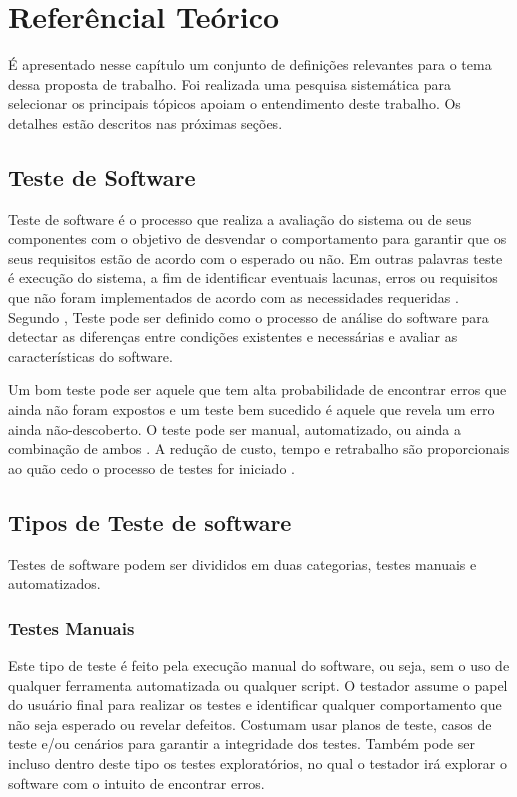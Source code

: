\chapter{Referêncial Teórico}

É apresentado nesse capítulo um conjunto de definições relevantes para o tema dessa proposta de trabalho. Foi realizada uma pesquisa sistemática para selecionar os principais tópicos apoiam o entendimento deste trabalho. Os detalhes estão descritos nas próximas seções.

\section{Teste de Software}

Teste de software é o processo que realiza a avaliação do sistema ou de seus componentes com o objetivo de desvendar o comportamento para garantir que os seus requisitos estão de acordo com o esperado ou não. Em outras palavras teste é execução do sistema, a fim de identificar eventuais lacunas, erros ou requisitos que não foram implementados de acordo com as necessidades requeridas \cite{tutorialsPoint}. Segundo \cite{ansiieee1059}, Teste pode ser definido como o processo de análise do software para detectar as diferenças entre condições existentes e necessárias e avaliar as características do software.

Um bom teste pode ser aquele que tem alta probabilidade de encontrar erros que ainda não foram expostos e um teste bem sucedido é aquele que revela um erro ainda não-descoberto. O teste pode ser manual, automatizado, ou ainda a combinação de ambos \cite{Pressman2002}. A redução de custo, tempo e retrabalho são proporcionais ao quão cedo o processo de testes for iniciado \cite{tutorialsPoint}.

\section{Tipos de Teste de software}

Testes de software podem ser divididos em duas categorias, testes manuais e automatizados.

\subsection{Testes Manuais}

		Este tipo de teste é feito pela execução manual do software, ou seja, sem o uso de qualquer ferramenta automatizada ou qualquer script. O testador assume o papel do usuário final para realizar os testes e identificar qualquer comportamento que não seja esperado ou revelar defeitos. Costumam usar planos de teste, casos de teste e/ou cenários para garantir a integridade dos testes. Também pode ser incluso dentro deste tipo os testes exploratórios, no qual o testador irá explorar o software com o intuito de encontrar erros\cite{tutorialsPoint}.
		
